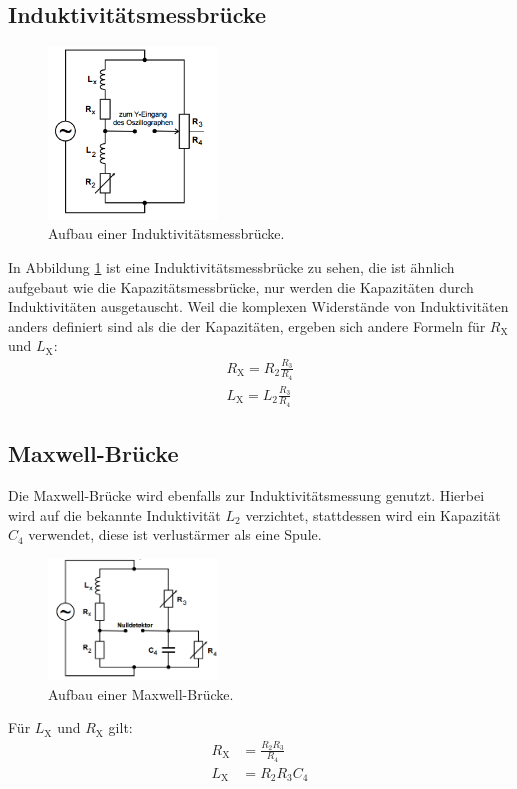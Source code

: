 \subsection{Induktivitätsmessbrücke}
\begin{figure}
 \centering
 \includegraphics[width=0.4\textwidth]{induktivitaet.PNG}
 \caption{Aufbau einer Induktivitätsmessbrücke.}
 \label{fig:induktivitaet}
 \end{figure}
 In Abbildung \ref{fig:induktivitaet} ist eine Induktivitätsmessbrücke zu sehen, die ist ähnlich aufgebaut wie die Kapazitätsmessbrücke,
 nur werden die Kapazitäten durch Induktivitäten ausgetauscht.
 Weil die komplexen Widerstände von Induktivitäten anders definiert sind als die der Kapazitäten, ergeben sich andere Formeln für $R_\mathrm{X}$ und $L_\mathrm{X}$:
 \begin{align}
   R_\mathrm{X}=R_\mathrm{2}\frac{R_\mathrm{3}}{R_\mathrm{4}}\label{eqn:LR}\\
   L_\mathrm{X}=L_\mathrm{2}\frac{R_\mathrm{3}}{R_\mathrm{4}} \label{eqn:LL}
 \end{align}
\subsection{Maxwell-Brücke}
\label{sec:Max}
Die Maxwell-Brücke wird ebenfalls zur Induktivitätsmessung genutzt.
Hierbei wird auf die bekannte Induktivität $L_\mathrm{2}$ verzichtet, stattdessen wird ein Kapazität $C_\mathrm{4}$ verwendet, diese ist verlustärmer als eine Spule.
\begin{figure}
 \centering
 \includegraphics[width=0.4\textwidth]{maxwell.PNG}
 \caption{Aufbau einer Maxwell-Brücke.\cite{sample}}
 \label{fig:maxwell}
 \end{figure}
Für $L_\mathrm{X}$ und $R_\mathrm{X}$ gilt:
\begin{align}
  R_\mathrm{X}&=\frac{R_\mathrm{2}R_\mathrm{3}}{R_\mathrm{4}}\label{eqn:RM}\\
  L_\mathrm{X}&=R_\mathrm{2}R_\mathrm{3}C_\mathrm{4}\label{eqn:LM}
\end{align}
